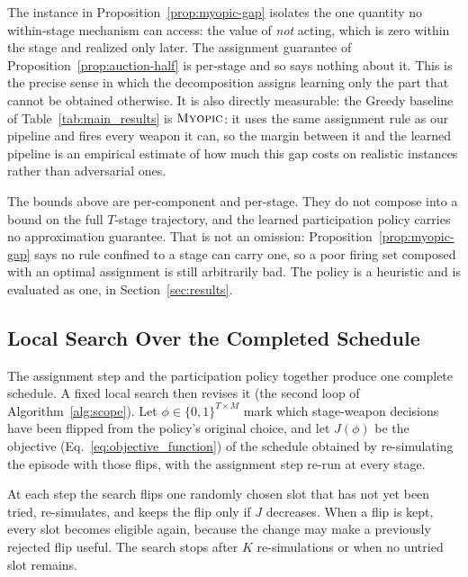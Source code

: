 \begin{remark}
\label{rem:myopic-is-the-job}
The instance in Proposition~\ref{prop:myopic-gap} isolates the one quantity
no within-stage mechanism can access: the value of \emph{not} acting, which
is zero within the stage and realized only later. The assignment guarantee
of Proposition~\ref{prop:auction-half} is per-stage and so says nothing about
it. This is the precise sense in which the decomposition assigns learning only
the part that cannot be obtained otherwise. It is also directly measurable: the
Greedy baseline of Table~\ref{tab:main_results} is $\textsc{Myopic}$: it uses
the same assignment rule as our pipeline and fires every weapon it can, so
the margin between it and the learned pipeline is an empirical estimate of
how much this gap costs on realistic instances rather than adversarial ones.
\end{remark}

\begin{remark}
\label{rem:scope}
The bounds above are per-component and per-stage. They do not compose into a
bound on the full $T$-stage trajectory, and the learned participation policy
carries no approximation guarantee. That is not an omission:
Proposition~\ref{prop:myopic-gap} says no rule confined to a stage can carry
one, so a poor firing set composed with an optimal assignment is still
arbitrarily bad. The policy is a heuristic and is evaluated as one, in
Section~\ref{sec:results}.
\end{remark}

\subsection{Local Search Over the Completed Schedule}
\label{sec:local-search}

The assignment step and the participation policy together produce one
complete schedule. A fixed local search then revises it (the second loop of
Algorithm~\ref{alg:scope}). Let $\phi \in \{0,1\}^{T \times M}$ mark which
stage-weapon decisions have been flipped from the policy's original choice,
and let $J(\phi)$ be the objective (Eq.~\eqref{eq:objective_function}) of the
schedule obtained by re-simulating the episode with those flips, with the
assignment step re-run at every stage.

At each step the search flips one randomly chosen slot that has not yet been
tried, re-simulates, and keeps the flip only if $J$ decreases. When a flip is
kept, every slot becomes eligible again, because the change may make a
previously rejected flip useful. The search stops after $K$ re-simulations or
when no untried slot remains.

